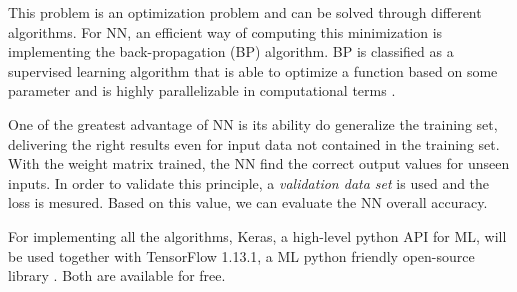 \documentclass[conference]{IEEEtran}
\begin{document}
This problem is an optimization problem and can be solved through different algorithms. For NN, an efficient way of computing this minimization is implementing the back-propagation (BP) algorithm. 	BP is classified as a supervised learning algorithm that is able to optimize a function based on some parameter and is highly parallelizable in computational terms \cite{b8}\cite{b9}.

One of the greatest advantage of NN is its ability do generalize the training set, delivering the right results even for input data not contained in the training set. With the weight matrix trained, the NN find the correct output values for unseen inputs. In order to validate this principle, a \textit{validation data set} is used and the loss is mesured. Based on this value, we can evaluate the NN overall accuracy.

For implementing all the algorithms, Keras, a high-level python API for ML, will be used together with TensorFlow 1.13.1, a ML python friendly open-source library \cite{b11} \cite{b12}. Both are available for free.
\end{document}
